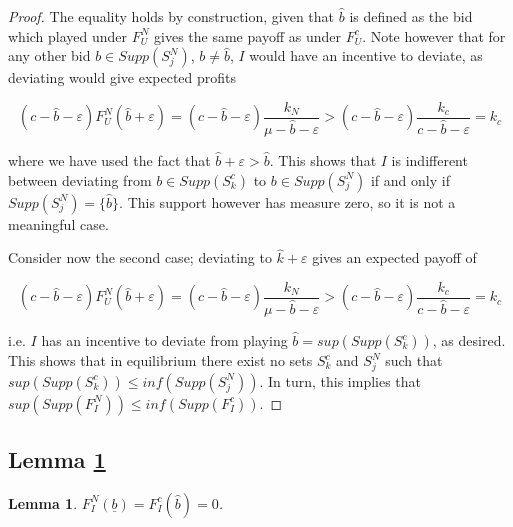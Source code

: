 \documentclass[11pt]{article}
\theoremstyle{plain}
\theoremstyle{definition}
\theoremstyle{plain}
\theoremstyle{plain}
\theoremstyle{plain}
\newtheorem{lem}[thm]{Lemma}
\theoremstyle{plain}
\numberwithin{equation}{section}
\begin{document}
\begin{proof}
    \noindent The equality holds by construction, given that $\hat{b}$ is defined as the bid which played under $F_U^N$ gives the same payoff as under $F_U^c$. Note however that for any other bid $b \in Supp(S_{j}^N)$, $b \neq \hat{b}$, $I$ would have an incentive to deviate, as deviating would give expected profits 

    \begin{equation*}
    (c-\hat{b}-\varepsilon)F_U^N(\hat{b}+\varepsilon)  =(c-\hat{b}-\varepsilon) \frac{k_N}{\mu- \hat{b}-\varepsilon} > (c-\hat{b}-\varepsilon) \frac{k_c}{c- \hat{b}-\varepsilon} = k_c
\end{equation*}
\vspace{-0.2cm}
    
\noindent where we have used the fact that $\hat{b}+ \varepsilon>\hat{b}$. This shows that $I$ is indifferent between deviating from $b \in Supp(S_{k}^c) $ to $b \in Supp(S_j^N)$ if and only if $Supp(S_j^N) = \{\hat{b}\}$. This support however has measure zero, so it is not a meaningful case. \par 
\noindent Consider now the second case; deviating to $\hat{k} + \varepsilon$ gives an expected payoff of 

\begin{equation*}
        (c-\hat{b}-\varepsilon)F_U^N(\hat{b}+\varepsilon) = (c-\hat{b}-\varepsilon) \frac{k_N}{\mu- \hat{b}-\varepsilon} > (c-\hat{b}-\varepsilon) \frac{k_c}{c- \hat{b}-\varepsilon} = k_c
    \end{equation*}
\vspace{-0.2cm}

\noindent i.e. $I$ has an incentive to deviate from  playing $\hat{b} = sup(Supp(S_{k}^c))$, as desired. This shows that in equilibrium there exist no sets $S_{k}^c$ and $S_{j}^N$ such that $sup(Supp(S_{k}^c))\leq inf(Supp(S_{j}^N))$. In turn, this implies that $sup(Supp(F_I^N))\leq inf(Supp(F_I^c))$.
\end{proof}

\vspace{3mm}

\subsection*{Lemma \ref{no-mass}}
\begin{lem}\label{no-mass}
    $F_I^N(\underline{b}) = F_I^c(\hat{b}) = 0$.
\end{lem}
\vspace{1mm}
\end{document}
